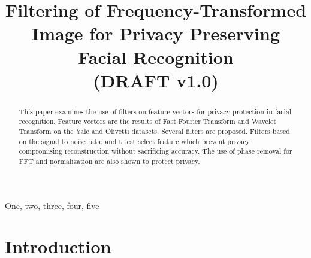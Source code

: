 \documentclass{article}
\title{Filtering of Frequency-Transformed Image 
for Privacy Preserving Facial Recognition \\(DRAFT v1.0)}
\begin{document}
%

\maketitle
%
\begin{abstract}
This paper examines the use of filters on feature vectors for 
privacy protection in facial recognition. Feature vectors are 
the results of Fast Fourier Transform and Wavelet Transform on 
the Yale and Olivetti datasets. Several filters are proposed. 
Filters based on the signal to noise ratio and t test select 
feature which prevent privacy compromising reconstruction without 
sacrificing accuracy. The use of phase removal for FFT and 
normalization are also shown to protect privacy.   
\end{abstract}
%
\begin{keywords}
One, two, three, four, five
\end{keywords}
%
\section{Introduction}
\label{sec:intro}
\end{document}
